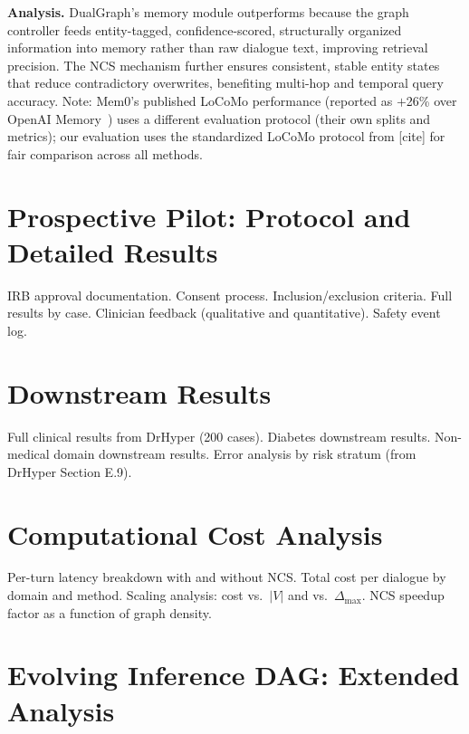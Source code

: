 \documentclass[11pt,a4paper]{article}
\newcommand{\placeholder}[1]{%
  \begin{tcolorbox}[colback=yellow!10,colframe=orange!60!black,
    fonttitle=\bfseries,title=Placeholder]
    #1
  \end{tcolorbox}%
}
\begin{document}
\placeholder{%
  \textbf{Analysis.} DualGraph's memory module outperforms because the graph
  controller feeds entity-tagged, confidence-scored, structurally organized
  information into memory rather than raw dialogue text, improving retrieval
  precision. The NCS mechanism further ensures consistent, stable entity
  states that reduce contradictory overwrites, benefiting multi-hop and
  temporal query accuracy. Note: Mem0's published LoCoMo performance
  (reported as $+$26\% over OpenAI Memory~\cite{mem0_2025}) uses a different
  evaluation protocol (their own splits and metrics); our evaluation uses
  the standardized LoCoMo protocol from [cite] for fair comparison across
  all methods.
}

\section{Prospective Pilot: Protocol and Detailed Results}
\label{app:pilot}

\placeholder{%
  IRB approval documentation.
  Consent process.
  Inclusion/exclusion criteria.
  Full results by case.
  Clinician feedback (qualitative and quantitative).
  Safety event log.
}

\section{Downstream Results}
\label{app:downstream}

\placeholder{%
  Full clinical results from DrHyper (200 cases).
  Diabetes downstream results.
  Non-medical domain downstream results.
  Error analysis by risk stratum (from DrHyper Section E.9).
}

\section{Computational Cost Analysis}
\label{app:compute}

\placeholder{%
  Per-turn latency breakdown with and without NCS.
  Total cost per dialogue by domain and method.
  Scaling analysis: cost vs.\ $|V|$ and vs.\ $\Delta_{\max}$.
  NCS speedup factor as a function of graph density.
}


\section{Evolving Inference DAG: Extended Analysis}
\label{app:evolving}
\end{document}
